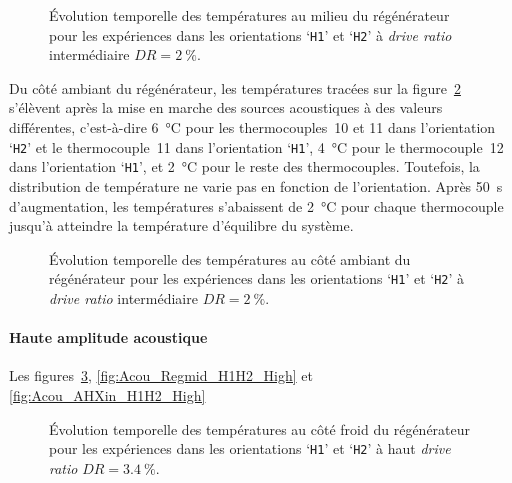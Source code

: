 \begin{figure}[!ht]
    \centering
    
    \caption{\'Evolution temporelle des températures au milieu du régénérateur pour les expériences dans les orientations `\texttt{H1}' et `\texttt{H2}' à \textit{drive ratio} intermédiaire $DR=\qty{2}{\percent}$.}
    \label{fig:Acou_Regmid_H1H2_Mid}
\end{figure}

Du côté ambiant du régénérateur, les températures tracées sur la figure~\ref{fig:Acou_AHXin_H1H2_Mid} s'élèvent après la mise en marche des sources acoustiques à des valeurs différentes, c'est-à-dire \qty{6}{\degreeCelsius} pour les thermocouples~10 et 11 dans l'orientation `\texttt{H2}' et le thermocouple~11 dans l'orientation `\texttt{H1}', \qty{4}{\degreeCelsius} pour le thermocouple~12 dans l'orientation `\texttt{H1}', et \qty{2}{\degreeCelsius} pour le reste des thermocouples. Toutefois, la distribution de température ne varie pas en fonction de l'orientation. Après \qty{50}{\second} d'augmentation, les températures s'abaissent de \qty{2}{\degreeCelsius} pour chaque thermocouple jusqu'à atteindre la température d'équilibre du système.

\begin{figure}[!ht]
    \centering
    
    \caption{\'Evolution temporelle des températures au côté ambiant du régénérateur pour les expériences dans les orientations `\texttt{H1}' et `\texttt{H2}' à \textit{drive ratio} intermédiaire $DR=\qty{2}{\percent}$.}
    \label{fig:Acou_AHXin_H1H2_Mid}
\end{figure}


\paragraph{Haute amplitude acoustique}
Les figures~\ref{fig:Acou_CHXin_H1H2_High}, \ref{fig:Acou_Regmid_H1H2_High} et \ref{fig:Acou_AHXin_H1H2_High}

\begin{figure}[!ht]
    \centering
    
    \caption{\'Evolution temporelle des températures au côté froid du régénérateur pour les expériences dans les orientations `\texttt{H1}' et `\texttt{H2}' à haut \textit{drive ratio} $DR=\qty{3.4}{\percent}$.}
    \label{fig:Acou_CHXin_H1H2_High}
\end{figure}

